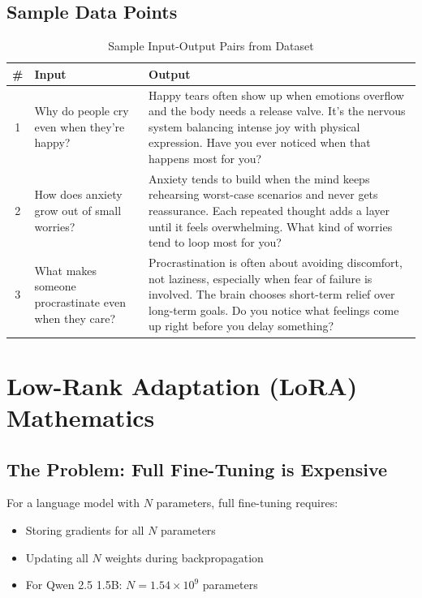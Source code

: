 \documentclass[12pt,a4paper]{article}
\begin{document}
\subsection{Sample Data Points}

\begin{table}[H]
\centering
\caption{Sample Input-Output Pairs from Dataset}
\small
\begin{tabular}{cp{4cm}p{7cm}}
\toprule
\textbf{\#} & \textbf{Input} & \textbf{Output} \\
\midrule
1 & Why do people cry even when they're happy? & Happy tears often show up when emotions overflow and the body needs a release valve. It's the nervous system balancing intense joy with physical expression. Have you ever noticed when that happens most for you? \\
\midrule
2 & How does anxiety grow out of small worries? & Anxiety tends to build when the mind keeps rehearsing worst-case scenarios and never gets reassurance. Each repeated thought adds a layer until it feels overwhelming. What kind of worries tend to loop most for you? \\
\midrule
3 & What makes someone procrastinate even when they care? & Procrastination is often about avoiding discomfort, not laziness, especially when fear of failure is involved. The brain chooses short-term relief over long-term goals. Do you notice what feelings come up right before you delay something? \\
\bottomrule
\end{tabular}
\end{table}

\section{Low-Rank Adaptation (LoRA) Mathematics}

\subsection{The Problem: Full Fine-Tuning is Expensive}

For a language model with $N$ parameters, full fine-tuning requires:
\begin{itemize}
    \item Storing gradients for all $N$ parameters
    \item Updating all $N$ weights during backpropagation
    \item For Qwen 2.5 1.5B: $N = 1.54 \times 10^9$ parameters
\end{itemize}
\end{document}
